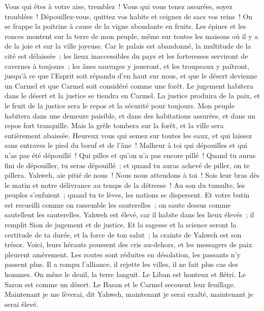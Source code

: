 \begin{multicols}{2}
Vous qui êtes à votre aise, tremblez~! Vous qui vous tenez assurées, soyez troublées~! Dépouillez-vous, quittez vos habits et ceignez de sacs vos reins~!
On se frappe la poitrine à cause de la vigne abondante en fruits.
Les épines et les ronces montent sur la terre de mon peuple, même sur toutes les maisons où il y a de la joie et sur la ville joyeuse.
Car le palais est abandonné, la multitude de la cité est délaissée~; les lieux inaccessibles du pays et les forteresses serviront de cavernes à toujours~; les ânes sauvages y joueront, et les troupeaux y paîtront,
jusqu'à ce que l'Esprit soit répandu d'en haut sur nous, et que le désert devienne un Carmel et que Carmel soit considéré comme une forêt.
Le jugement habitera dans le désert et la justice se tiendra en Carmel.
La justice produira de la paix, et le fruit de la justice sera le repos et la sécurité pour toujours.
Mon peuple habitera dans une demeure paisible, et dans des habitations assurées, et dans un repos fort tranquille.
Mais la grêle tombera sur la forêt, et la ville sera entièrement abaissée.
Heureux vous qui semez sur toutes les eaux, et qui laissez sans entraves le pied du bœuf et de l'âne~!
\VerseOne{}Malheur à toi qui dépouilles et qui n'as pas été dépouillé~! Qui pilles et qu'on n'a pas encore pillé~! Quand tu auras fini de dépouiller, tu seras dépouillé~; et quand tu auras achevé de piller, on te pillera.
Yahweh, aie pitié de nous~! Nous nous attendons à toi~! Sois leur bras dès le matin et notre délivrance au temps de la détresse~!
Au son du tumulte, les peuples s'enfuient~; quand tu te lèves, les nations se dispersent.
Et votre butin est recueilli comme on rassemble les sauterelles~; on saute dessus comme sautellent les sauterelles.
Yahweh est élevé, car il habite dans les lieux élevés~; il remplit Sion de jugement et de justice.
Et la sagesse et la science seront la certitude de ta durée, et la force de ton salut~; la crainte de Yahweh est son trésor.
Voici, leurs hérauts poussent des cris au-dehors, et les messagers de paix pleurent amèrement.
Les routes sont réduites en désolation, les passants n'y passent plus. Il a rompu l'alliance, il rejette les villes, il ne fait plus cas des hommes.
On mène le deuil, la terre languit. Le Liban est honteux et flétri. Le Saron est comme un désert. Le Basan et le Carmel secouent leur feuillage.
Maintenant je me lèverai, dit Yahweh, maintenant je serai exalté, maintenant je serai élevé.

\end{multicols}
